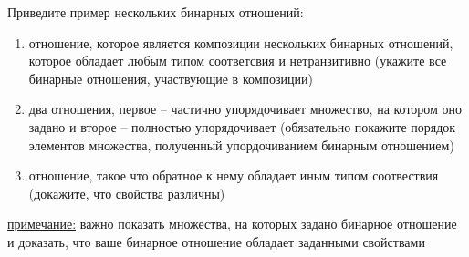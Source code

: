 \question
Приведите  пример  нескольких бинарных отношений:
\begin{enumerate}
	\renewcommand{\labelenumi}{\alph{enumi})}
	\item отношение, которое является композиции нескольких бинарных отношений,  которое  обладает любым типом соответсвия  и нетранзитивно (укажите все бинарные отношения, участвующие в композиции)
	\item два отношения, первое -- частично упорядочивает множество, на котором оно задано и второе -- полностью упорядочивает (обязательно покажите порядок элементов множества, полученный упордочиванием бинарным отношением)
	\item отношение, такое что  обратное к нему  обладает иным типом соотвествия (докажите, что свойства различны)
\end{enumerate}

\underline{примечание:} важно показать  множества, на которых задано бинарное отношение и доказать, что ваше бинарное отношение обладает заданными свойствами
